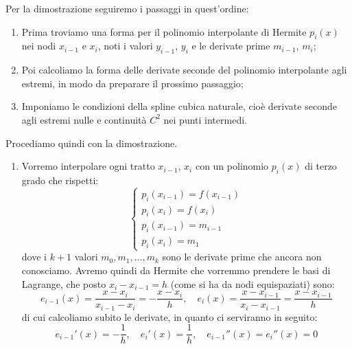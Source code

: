 \documentclass[a4paper,11pt]{article}
\begin{document}
\begin{itemize}
		Per la dimostrazione seguiremo i passaggi in quest'ordine:
		\begin{enumerate}
			\item Prima troviamo una forma per il polinomio interpolante di Hermite $p_i(x)$ nei nodi $x_{i - 1}$ e $x_{i}$, noti i valori $y_{i - 1}$, $y_i$ e le derivate prime $m_{i - 1}$, $m_i$;
			\item Poi calcoliamo la forma delle derivate seconde del polinomio interpolante agli estremi, in modo da preparare il prossimo passaggio;
			\item Imponiamo le condizioni della spline cubica naturale, cioè derivate seconde agli estremi nulle e continuità $C^2$ nei punti intermedi.
		\end{enumerate}

		Procediamo quindi con la dimostrazione.

		\begin{enumerate}
			\item 
				Vorremo interpolare ogni tratto $x_{i - 1}$, $x_i$ con un polinomio $p_i(x)$ di terzo grado che rispetti:
				\[
					\begin{cases}
						p_i(x_{i - 1}) = f(x_{i - 1}) \\
						p_i(x_i) = f(x_i) \\
						p_i(x_{i - 1}) = m_{i - 1} \\
						p_i(x_i) = m_1
					\end{cases}
				\]
				dove i $k + 1$ valori $m_0, m_1, ..., m_k$ sono le derivate prime che ancora non conosciamo.
				Avremo quindi da Hermite che vorremmo prendere le basi di Lagrange, che posto $x_i - x_{i - 1} = h$ (come si ha da nodi equispaziati) sono:
				$$
				e_{i-1}(x) = \frac{x - x_i}{x_{i-1} - x_i} = -\frac{x - x_i}{h}, \quad e_i(x) = \frac{x - x_{i-1}}{x_i - x_{i-1}} = \frac{x - x_{i - 1}}{h}
				$$
				di cui calcoliamo subito le derivate, in quanto ci serviranno in seguito:
				$$
				e_{i-1}'(x) = -\frac{1}{h}, \quad e_{i}'(x) = \frac{1}{h}, \quad e_{i - 1}''(x) = e_{i}''(x) = 0
				$$


\end{enumerate}
\end{itemize}
\end{document}
